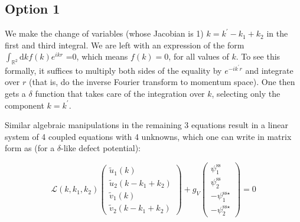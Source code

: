 \documentclass[12pt]{article}
\begin{document}
\subsection{Option 1}
We make the change of variables (whose Jacobian is 1) $k = k^{\prime}-k_1+k_2$ in the first and third integral.
We are left with an expression of the form $\int_{\mathbb{R}^{2}}\mathrm{d}k f(k) e^{ikr}$ =0, which means $f(k)=0$, for all values of $k$. To see this formally, it suffices to multiply both sides of the equality by $e^{-i k^{\prime} r}$ and integrate over $r$ (that is, do the inverse Fourier transform to momentum space). One then gets a $\delta$ function that takes care of the integration over $k$, selecting only the component $k=k^{\prime}$.

Similar algebraic manipulations in the remaining 3 equations result in a linear system of 4 coupled equations with 4 unknowns, which one can write in matrix form as (for a $\delta$-like defect potential):

\begin{equation}
\mathcal{L}(k,k_1,k_2)
\left(\begin{array}{c}
\tilde{u}_{1}(k)\\
\tilde{u}_{2}(k-k_{1}+k_{2})\\
\tilde{v}_{1}(k)\\
\tilde{v}_{2}(k-k_{1}+k_{2})
\end{array}\right)
+g_V
\left(\begin{array}{c}
\psi_{1}^{\text{ss}}\\
\psi_{2}^{\text{ss}}\\
-\psi_{1}^{\text{ss}\star}\\
-\psi_{2}^{\text{ss}\star}
\end{array}\right)=0
\end{equation}
\end{document}
